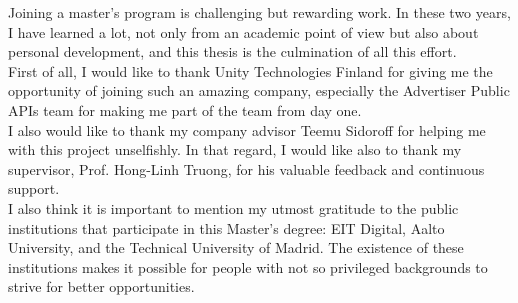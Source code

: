 \documentclass[english, 12pt, a4paper, sci, utf8, a-1b, online]{aaltothesis}
\date{\today}
\begin{document}
\makecoverpage

\makecopyrightpage


\begin{abstractpage}[english]
  \abstracttext{
  }
\end{abstractpage}


\newpage


Joining a master's program is challenging but rewarding work. In these two years, I have learned a lot, not only from an academic point of view but also about personal development, and this thesis is the culmination of all this effort.\\

First of all, I would like to thank Unity Technologies Finland for giving me the opportunity of joining such an amazing company, especially the Advertiser Public APIs team for making me part of the team from day one.\\

I also would like to thank my company advisor Teemu Sidoroff for helping me with this project unselfishly. In that regard, I would like also to thank my supervisor, Prof. Hong-Linh Truong, for his valuable feedback and continuous support.\\

I also think it is important to mention my utmost gratitude to the public institutions that participate in this Master's degree: EIT Digital, Aalto University, and the Technical University of Madrid. The existence of these institutions makes it possible for people with not so privileged backgrounds to strive for better opportunities.\\
\end{document}
